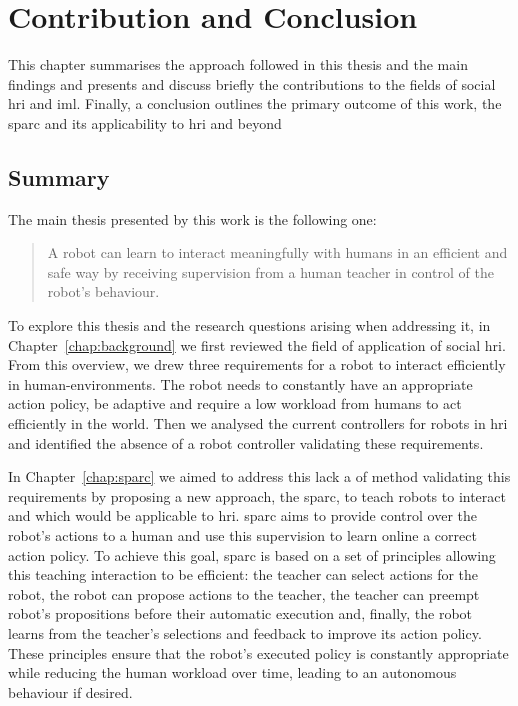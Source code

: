 \chapter{Contribution and Conclusion} \label{chap:conclusion}
\glsresetall
This chapter summarises the approach followed in this thesis and the main findings and presents and discuss briefly the contributions to the fields of social \gls{hri} and \gls{iml}. Finally, a conclusion outlines the primary outcome of this work, the \acrfull{sparc} and its applicability to \gls{hri} and beyond

\section{Summary}\label{sec:conc_summary}

The main thesis presented by this work is the following one: 
\begin{quote}
	A robot can learn to interact meaningfully with humans in an efficient and safe way by receiving supervision from a human teacher in control of the robot's behaviour. 
\end{quote}

To explore this thesis and the research questions arising when addressing it, in Chapter~\ref{chap:background} we first reviewed the field of application of social \gls{hri}. From this overview, we drew three requirements for a robot to interact efficiently in human-environments. The robot needs to constantly have an appropriate action policy, be adaptive and require a low workload from humans to act efficiently in the world. Then we analysed the current controllers for robots in \gls{hri} and identified the absence of a robot controller validating these requirements.

In Chapter~\ref{chap:sparc} we aimed to address this lack a of method validating this requirements by proposing a new approach, the \gls{sparc}, to teach robots to interact and which would be applicable to \gls{hri}. \gls{sparc} aims to provide control over the robot's actions to a human and use this supervision to learn online a correct action policy. To achieve this goal, \gls{sparc} is based on a set of principles allowing this teaching interaction to be efficient: the teacher can select actions for the robot, the robot can propose actions to the teacher, the teacher can preempt robot's propositions before their automatic execution and, finally, the robot learns from the teacher's selections and feedback to improve its action policy. These principles ensure that the robot's executed policy is constantly appropriate while reducing the human workload over time, leading to an autonomous behaviour if desired.

